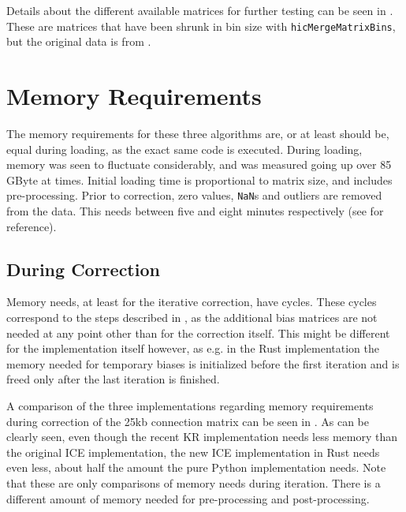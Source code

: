 
Details about the different available matrices for further testing can be seen
in . These are matrices that have been shrunk in bin size
with \verb|hicMergeMatrixBins|, but the original data is from \cite{rao20143d}.







\section{Memory Requirements}\label{sec:memory}

The memory requirements for these three algorithms are, or at least should be,
equal during loading, as the exact same code is executed. During loading,
memory was seen to fluctuate considerably, and was measured going up over 85
GByte at times. Initial loading time is proportional to matrix size, and
includes pre-processing. Prior to correction, zero values, \verb|NaN|s and
outliers are removed from the data. This needs between five and eight minutes
respectively (see  for reference).


\newpage
\subsection{During Correction}\label{sec:itermem}

Memory needs, at least for the iterative correction, have cycles. These cycles
correspond to the steps described in , as the additional bias
matrices are not needed at any point other than for the correction itself. This
might be different for the implementation itself however, as e.g. in the Rust
implementation the memory needed for temporary biases is initialized before the
first iteration and is freed only after the last iteration is finished.

A comparison of the three implementations regarding memory requirements during
correction of the 25kb connection matrix can be seen in .
As can be clearly seen, even though the recent KR implementation needs less
memory than the original ICE implementation, the new ICE implementation in Rust
needs even less, about half the amount the pure Python implementation needs.
Note that these are only comparisons of memory needs during iteration. There is
a different amount of memory needed for pre-processing and post-processing.

